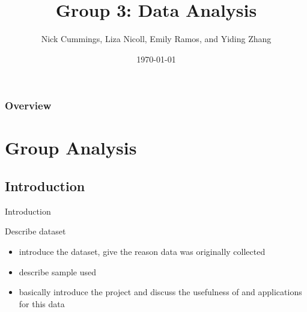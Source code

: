 \documentclass[table]{beamer}
\title[Group3:Data Analysis]{Group 3: Data Analysis} %
\author[Emily, Nick, Liza and Yiding]{Nick Cummings, Liza Nicoll, Emily Ramos, and Yiding Zhang} %
\institute[UMASS] %
{
University of Massachusetts, Amherst \\ %
\medskip
}
\date{\today} %
\begin{document}


\begin{frame}
\titlepage %
\end{frame}

\begin{frame}
\frametitle{Overview} %
\tableofcontents %
\end{frame}


\section{Group Analysis} %

\subsection{Introduction} %

\begin{frame}{Introduction}


Describe dataset
\begin{itemize}
\item introduce the dataset, give the reason data was originally collected
\item describe sample used
\item basically introduce the project and discuss the usefulness of and applications for this data
\end{itemize}
\end{frame}
\end{document}
